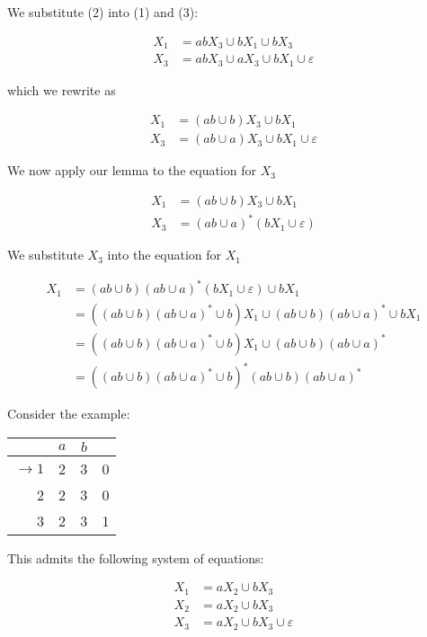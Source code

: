 We substitute (2) into (1) and (3):

\begin{align*}
      X_1 &= abX_3\cup bX_1\cup bX_3\\
      X_3 &= abX_3\cup aX_3\cup bX_1\cup\varepsilon
\end{align*}

which we rewrite as

\begin{align*}
      X_1 &= (ab\cup b)X_3\cup bX_1\\
      X_3 &= (ab\cup a)X_3\cup bX_1\cup\varepsilon
\end{align*}

We now apply our lemma to the equation for $X_3$

\begin{align*}
      X_1 &= (ab\cup b)X_3\cup bX_1\\
      X_3 &= (ab\cup a)^*(bX_1\cup\varepsilon)
\end{align*}

We substitute $X_3$ into the equation for $X_1$

\begin{align*}
      X_1&=(ab\cup b)(ab\cup a)^*(bX_1\cup\varepsilon)\cup bX_1\\
         &=\left((ab\cup b)(ab\cup a)^*\cup b\right)X_1\cup (ab\cup b)(ab\cup a)^*\cup bX_1\\
         &=\left((ab\cup b)(ab\cup a)^*\cup b\right)X_1\cup (ab\cup b)(ab\cup a)^*\\
         &=\left((ab\cup b)(ab\cup a)^*\cup b\right)^*(ab\cup b)(ab\cup a)^*
\end{align*}

Consider the example:

\begin{center}\begin{tabular}{r| c c r}
      & $a$ & $b$ & \\\hline
      $\to 1$ & 2 & 3 & 0\\
            2 & 2 & 3 & 0\\
            3 & 2 & 3 & 1
 \end{tabular}\end{center}

 This admits the following system of equations:

 \begin{align*}
      X_1 &= aX_2\cup bX_3\\
      X_2 &= aX_2\cup bX_3\\
      X_3 &= aX_2\cup bX_3\cup\varepsilon
\end{align*}

